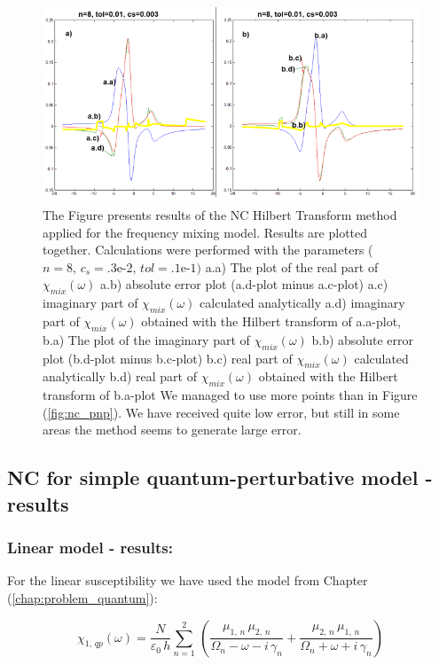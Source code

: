 \documentclass[12pt,twoside,a4paper]{article}
\numberwithin{equation}{subsection}
\numberwithin{figure}{subsection}
\begin{document}
\begin{figure} 
  \includegraphics[width=150mm]{img/nc_fmix1.png}
  \caption{ The Figure presents results of the NC Hilbert Transform method applied for the frequency mixing model.
  Results are plotted together. Calculations were performed with the parameters ($n = 8, \, c_s = \mbox{.3e-2}, \, tol = \mbox{.1e-1})$
     a.a) The plot of the real part of ${\chi_{mix}}(\omega )$
     a.b) absolute error plot (a.d-plot minus a.c-plot) 
     a.c) imaginary part of ${\chi_{mix}}(\omega )$ calculated analytically 
     a.d) imaginary part of ${\chi_{mix}}(\omega )$ obtained with the Hilbert transform of a.a-plot, 
     b.a) The plot of the imaginary part of ${\chi_{mix}}(\omega )$ 
     b.b) absolute error plot (b.d-plot minus b.c-plot) 
     b.c) real part of $\chi_{mix} (\omega )$ calculated analytically 
     b.d) real part of ${\chi_{mix}}(\omega )$ obtained with the Hilbert transform of b.a-plot
     We managed to use more points than in Figure (\ref{fig:nc_pnp}). We have received quite low error, but still in some areas 
     the method seems to generate large error.
     \label{fig:nc_fmix1}
     }
\end{figure}

\subsection{NC for simple quantum-perturbative model - results} \label{chap:nc_quantum}

\subsubsection*{Linear model - results:}

For the linear susceptibility we have used the model from Chapter (\ref{chap:problem_quantum}): 

\begin{equation} \label{eq:nclin_chipp}
  \chi_{1, \, qp}(\omega ) = \frac {N}{\varepsilon_0 \, h} \sum_{n=1}^{2} \, 
    ( \frac {{\mu_{1, \,n}} \, { \mu_{2, \, n}}}
            {{\Omega_{n}} - \omega  - i \, {\gamma_{n}}} 
    + \frac {{\mu_{2, \,n}}\,{\mu_{1, \,n}}}
            {{\Omega_{n}} + \omega + i \, {\gamma_{n}}} )
\end{equation}
\end{document}
